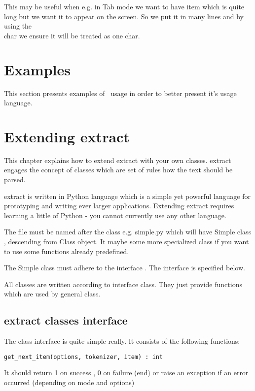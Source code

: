 \documentclass[a4paper,11pt]{article}
\newcommand{\probe}{\emph{\sc{probe{}}}}
\begin{document}
This may be useful when e.g. in Tab mode we want to have item which is quite
long but we want it to appear on the screen. So we put it in many lines and by
using the \\ char we ensure it will be treated as one char.
\section{Examples}
This section presents examples of \probe\ usage in order to better present
it's usage language.



\section{Extending extract}
This chapter explains how to extend extract with your own classes.
extract engages the concept of classes which are set of rules how the text should
be parsed.


extract is written in Python language which is a simple yet powerful language for
prototyping and writing ever larger applications. Extending extract requires
learning a little of Python - you cannot currently use any other language.

The file must be named after the class e.g. simple.py which will have Simple
class , descending from Class object. It maybe some more specialized class if
you want to use some functions already predefined.

The Simple class must adhere to the interface . The interface is specified
below.

All classes are written according to interface class. They just provide
functions which are used by general class.



\subsection{extract classes interface}

The class interface is quite simple really.
It consists of the following functions:

\begin{verbatim}
get_next_item(options, tokenizer, item) : int
\end{verbatim}

It should return 1 on success , 0 on failure (end) or raise an exception if an
error occurred (depending on mode and options)
\end{document}
